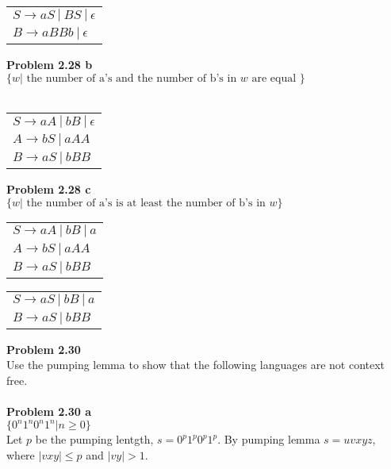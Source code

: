 \documentclass{article}
\newcommand{\problem}[1]{\large{\textbf{Problem #1} \\}}
\begin{document}
\begin{table}[h!]
\centering
\begin{tabular}{l}
$S \rightarrow a S\: | \:B S \:|\: \epsilon $\\
$B \rightarrow a BB b \: | \: \epsilon$\\
\end{tabular}
\end{table}

\problem{2.28 b}
$\{w| \text{ the number of a's and the number of b's in } w \text{ are equal }\}$ \\ \\

\begin{table}[h!]
\centering
\begin{tabular}{l}
$S \rightarrow a A\: | \:b B \:|\: \epsilon $\\
$A \rightarrow b S \:| \:a AA $ \\
$B \rightarrow a S \:| \:b BB $ \\
\end{tabular}
\end{table}
\problem{2.28 c}
$\{w| \text{ the number of a's is at least the number of b's in } w\}$

\begin{table}[h!]
\centering
\begin{tabular}{l}
$S \rightarrow a A\: | \:b B \:|\: a $\\
$A \rightarrow b S \:| \:a AA $ \\
$B \rightarrow a S \:| \:b BB $ \\
\end{tabular}
\end{table}

\begin{table}[h!]
\centering
\begin{tabular}{l}
$S \rightarrow a S\: | \:b B \:|\: a $\\
$B \rightarrow a S \:| \:b BB $ \\
\end{tabular}
\end{table}

\problem{2.30}
Use the pumping lemma to show that the following languages are not context free. \\ \\
\problem{2.30 a}
$\{ 0^n 1^n 0^n 1^n | n \geq 0  \}$ \\

Let $p$ be the pumping lentgth, $s = 0^p 1^p 0^p 1^p$. By pumping lemma $s = uvxyz$, where $|vxy| \leq p$ and $|vy| > 1$.
\end{document}

